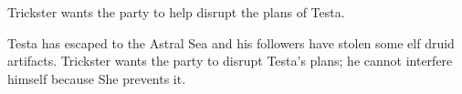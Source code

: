 Trickster wants the party to help disrupt the plans of Testa.

Testa has escaped to the Astral Sea and his followers have stolen some elf druid artifacts.
Trickster wants the party to disrupt Testa's plans; he cannot interfere himself because She prevents it.
